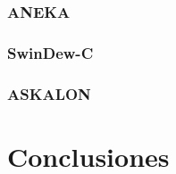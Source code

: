 \documentclass[letterpaper, 12pt]{report}
\begin{document}
\subsection{ANEKA}

\subsection{SwinDew-C}

\subsection{ASKALON}


\chapter{Conclusiones}



\end{document}
